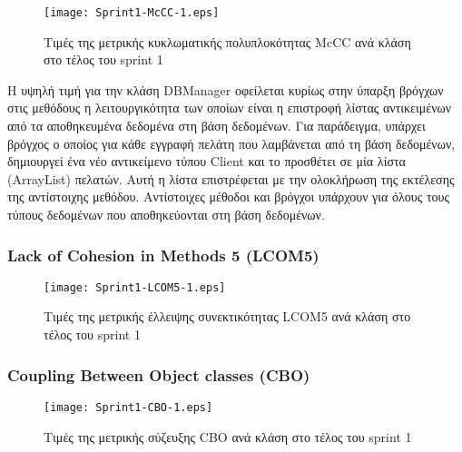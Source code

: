 \begin{figure}
\centering
\texttt{[image: Sprint1-McCC-1.eps]}
\caption{Τιμές της μετρικής κυκλωματικής πολυπλοκότητας McCC ανά κλάση στο τέλος του sprint 1}
\label{fig:sprint1McCC}
\end{figure}

H υψηλή τιμή για την κλάση DBManager οφείλεται κυρίως στην
ύπαρξη βρόγχων στις μεθόδους η λειτουργικότητα των οποίων είναι η
επιστροφή λίστας αντικειμένων από τα αποθηκευμένα δεδομένα στη βάση
δεδομένων. Για παράδειγμα, υπάρχει βρόγχος ο οποίος για κάθε εγγραφή
πελάτη που λαμβάνεται από τη βάση δεδομένων, δημιουργεί ένα νέο
αντικείμενο τύπου Client και το προσθέτει σε μία λίστα (ArrayList)
πελατών. Αυτή η λίστα επιστρέφεται με την ολοκλήρωση της εκτέλεσης της
αντίστοιχης μεθόδου. Αντίστοιχες μέθοδοι και βρόγχοι υπάρχουν για όλους
τους τύπους δεδομένων που αποθηκεύονται στη βάση δεδομένων.

\subsubsection{Lack of Cohesion in Methods 5 (LCOM5)}
\label{section:sprint1LCOM5}

\begin{figure}
\centering
\texttt{[image: Sprint1-LCOM5-1.eps]}
\caption{Τιμές της μετρικής έλλειψης συνεκτικότητας LCOM5 ανά κλάση στο τέλος του sprint 1}
\label{fig:sprint1LCOM5}
\end{figure}

\subsubsection{Coupling Between Object classes (CBO)}
\label{section:sprint1CBO}

\begin{figure}
\centering
\texttt{[image: Sprint1-CBO-1.eps]}
\caption{Τιμές της μετρικής σύζευξης CBO ανά κλάση στο τέλος του sprint 1}
\label{fig:sprint1CBO}
\end{figure}

